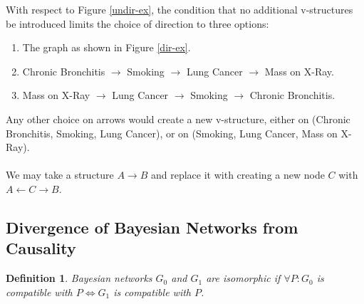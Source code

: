 \documentclass{article}
\newtheorem{definition}{Definition}
\begin{document}
	With respect to Figure \ref{undir-ex}, the condition that no additional v-structures be introduced limits the choice of direction to three options:
	\begin{enumerate}
		\item The graph as shown in Figure \ref{dir-ex}.
		\item Chronic Bronchitis $\rightarrow$ Smoking $\rightarrow$ Lung Cancer $\rightarrow$ Mass on X-Ray.
		\item Mass on X-Ray $\rightarrow$ Lung Cancer $\rightarrow$ Smoking $\rightarrow$ Chronic Bronchitis.
	\end{enumerate}
	Any other choice on arrows would create a new v-structure, either on (Chronic Bronchitis, Smoking, Lung Cancer), or on (Smoking, Lung Cancer, Mass on X-Ray).
	\paragraph{}
	
	We may take a structure $A \rightarrow B$ and replace it with creating a new node $C$ with $A \leftarrow C \rightarrow B$.
	
	\subsection{Divergence of Bayesian Networks from Causality}
	
	\begin{definition}
		Bayesian networks $G_0$ and $G_1$ are isomorphic if $\forall P: G_0$ is compatible with $P \iff G_1$ is compatible with $P$.
	\end{definition}
	
	
	\appendix
	
\end{document}
